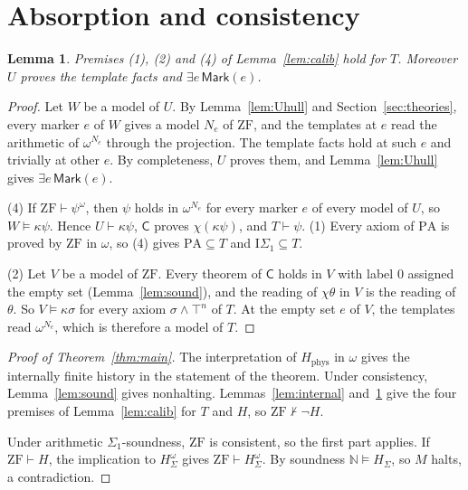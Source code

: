 \documentclass[11pt,letterpaper]{article}
\newtheorem{lemma}[theorem]{Lemma}
\newcommand{\ZF}{\mathrm{ZF}}
\newcommand{\PA}{\mathrm{PA}}
\newcommand{\ISig}{\mathrm{I}\Sigma_1}
\newcommand{\N}{\mathbb{N}}
\newcommand{\Cc}{\mathsf{C}}
\newcommand{\mk}{\mathsf{Mark}}
\begin{document}
\section{Absorption and consistency}\label{sec:absorb}

\begin{lemma}\label{lem:absorb}
Premises (1), (2) and (4) of Lemma~\ref{lem:calib} hold for $T$. Moreover
$U$ proves the template facts and $\exists e\,\mk(e)$.
\end{lemma}

\begin{proof}
Let $W$ be a model of $U$. By Lemma~\ref{lem:Uhull} and
Section~\ref{sec:theories}, every marker $e$ of $W$ gives a model $N_e$ of $\ZF$, and the templates at
$e$ read the arithmetic of $\omega^{N_e}$ through the projection. The
template facts hold at such $e$ and trivially at other $e$. By
completeness, $U$ proves them, and Lemma~\ref{lem:Uhull} gives
$\exists e\,\mk(e)$.

(4) If $\ZF\vdash\psi^\omega$, then $\psi$ holds in $\omega^{N_e}$ for every
marker $e$ of every model of $U$, so $W\models\kappa\psi$. Hence
$U\vdash\kappa\psi$, $\Cc$ proves $\chi(\kappa\psi)$, and $T\vdash\psi$.
(1) Every axiom of $\PA$ is proved by $\ZF$ in $\omega$, so (4) gives
$\PA\subseteq T$ and $\ISig\subseteq T$.

(2) Let $V$ be a model of $\ZF$. Every theorem of $\Cc$ holds in $V$ with
label $0$ assigned the empty set (Lemma~\ref{lem:sound}), and the reading
of $\chi\theta$ in $V$ is the reading of $\theta$. So $V\models\kappa\sigma$
for every axiom $\sigma\wedge\top^n$ of $T$. At the empty set $e$ of $V$,
the templates read $\omega^{N_e}$, which is therefore a model of $T$.
\end{proof}

\begin{proof}[Proof of Theorem~\ref{thm:main}]
The interpretation of $H_{\mathrm{phys}}$ in $\omega$ gives the internally
finite history in the statement of the theorem. Under consistency,
Lemma~\ref{lem:sound} gives nonhalting. Lemmas~\ref{lem:internal}
and~\ref{lem:absorb} give the four premises of Lemma~\ref{lem:calib} for
$T$ and $H$, so $\ZF\nvdash\neg H$.

Under arithmetic $\Sigma_1$-soundness, $\ZF$ is consistent, so the first
part applies. If $\ZF\vdash H$, the implication to $H_\Sigma^\omega$
gives $\ZF\vdash H_\Sigma^\omega$. By soundness $\N\models H_\Sigma$,
so $M$ halts, a contradiction.
\end{proof}
\end{document}
